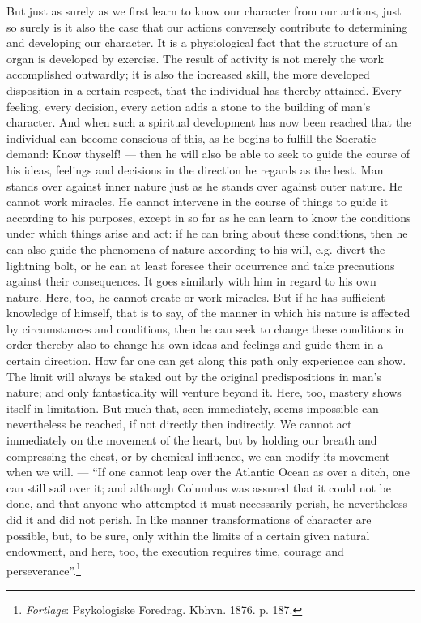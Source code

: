 \documentclass[12pt,a4paper,openany]{book}
\newcommand{\opage}[1]{\marginnote{\footnotesize\textit{[#1]}}}
\begin{document}
But just as surely as we first learn to know our character from our actions,
just so surely is it \opage{119}also the case that our actions conversely
contribute to determining and developing our character. It is a physiological
fact that the structure of an organ is developed by exercise. The result of
activity is not merely the work accomplished outwardly; it is also the
increased skill, the more developed disposition in a certain respect, that the
individual has thereby attained. Every feeling, every decision, every action
adds a stone to the building of man's character. And when such a spiritual
development has now been reached that the individual can become conscious of
this, as he begins to fulfill the Socratic demand: Know thyself! --- then he
will also be able to seek to guide the course of his ideas, feelings and
decisions in the direction he regards as the best. Man stands over against
inner nature just as he stands over against outer nature. He cannot work
miracles. He cannot intervene in the course of things to guide it according to
his purposes, except in so far as he can learn to know the conditions under
which things arise and act: if he can bring about these conditions, then he
can also guide the phenomena of nature according to his will, e.g. divert the
lightning bolt, or he can at least foresee their occurrence and take
precautions against their consequences. It goes similarly with him in regard
to his own nature. Here, too, he cannot create or work miracles. But if he has
sufficient knowledge of himself, that is to say, of the manner in which his
nature is affected by circumstances and \opage{120}conditions, then he can
seek to change these conditions in order thereby also to change his own ideas
and feelings and guide them in a certain direction. How far one can get along
this path only experience can show. The limit will always be staked out by the
original predispositions in man's nature; and only fantasticality will venture
beyond it. Here, too, mastery shows itself in limitation. But much that, seen
immediately, seems impossible can nevertheless be reached, if not directly
then indirectly. We cannot act immediately on the movement of the heart, but
by holding our breath and compressing the chest, or by chemical influence, we
can modify its movement when we will. --- ``If one cannot leap over the
Atlantic Ocean as over a ditch, one can still sail over it; and although
Columbus was assured that it could not be done, and that anyone who attempted
it must necessarily perish, he nevertheless did it and did not perish. In like
manner transformations of character are possible, but, to be sure, only within
the limits of a certain given natural endowment, and here, too, the execution
requires time, courage and perseverance''.\footnote[1]{\emph{Fortlage}:
Psykologiske Foredrag. Kbhvn. 1876. p. 187.}
\end{document}
